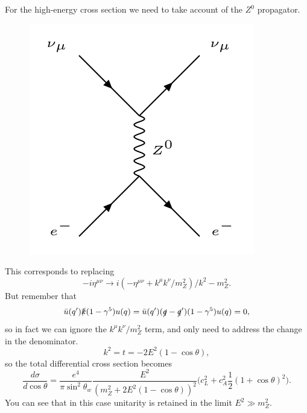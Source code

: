 \documentclass[a4paper,12pt]{article}
\begin{document}
For the high-energy cross section we need to take account of the $Z^0$ propagator.
\begin{figure}
  \includegraphics[width=\linewidth]{figs/25a.png}
\end{figure}
This corresponds to replacing 
\begin{equation}
-i\eta^{\mu\nu} \to i(-\eta^{\mu\nu} + k^\mu k^\nu/m_Z^2)/k^2-m_Z^2.
\end{equation} 
But remember that 
\begin{equation}
\bar{u}(q^\prime)\slashed{k}(1-\gamma^5)u(q) = \bar{u}(q^\prime)(\slashed{q}-\slashed{q}^\prime)(1-\gamma^5)u(q)=0,
\end{equation}
so in fact we can ignore the $k^\mu k^\nu/m_Z^2$ term, and only need to address the change in the denominator. 
\begin{equation}
k^2 = t = -2E^2(1-\cos\theta),
\end{equation}
so the total differential cross section becomes
\begin{equation}
\frac{d\sigma}{d\cos\theta} = \frac{e^4}{\pi\sin^2\theta_w}\frac{E^2}{(m_Z^2 + 2E^2(1-\cos\theta))^2}\big(c_L^2 + c_A^2 \frac{1}{2}(1+\cos\theta)^2\big).
\end{equation}
You can see that in this case unitarity is retained in the limit $E^2 \gg m_Z^2$.
%
\end{document}
